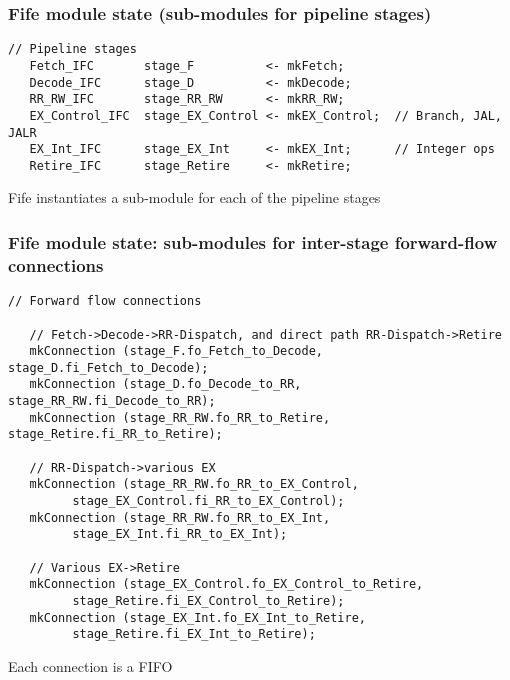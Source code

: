 \begin{frame}[fragile]
\frametitle{Fife module state (sub-modules for pipeline stages)}

\footnotesize

\begin{minipage}{0.75\textwidth}
\begin{Verbatim}[frame=single, label=From src\_Fife/CPU.bsv]
   // Pipeline stages
   Fetch_IFC       stage_F          <- mkFetch;
   Decode_IFC      stage_D          <- mkDecode;
   RR_RW_IFC       stage_RR_RW      <- mkRR_RW;
   EX_Control_IFC  stage_EX_Control <- mkEX_Control;  // Branch, JAL, JALR
   EX_Int_IFC      stage_EX_Int     <- mkEX_Int;      // Integer ops
   Retire_IFC      stage_Retire     <- mkRetire;
\end{Verbatim}
\end{minipage}
\hm
\begin{minipage}{0.22\textwidth}
Fife instantiates a sub-module for each of the pipeline stages
\end{minipage}



\end{frame}


\begin{frame}[fragile]
\frametitle{Fife module state: sub-modules for inter-stage forward-flow connections}

\footnotesize

\begin{minipage}{0.75\textwidth}\scriptsize
\begin{Verbatim}[frame=single, label=From src\_Fife/CPU.bsv]
   // Forward flow connections

   // Fetch->Decode->RR-Dispatch, and direct path RR-Dispatch->Retire
   mkConnection (stage_F.fo_Fetch_to_Decode,  stage_D.fi_Fetch_to_Decode);
   mkConnection (stage_D.fo_Decode_to_RR,     stage_RR_RW.fi_Decode_to_RR);
   mkConnection (stage_RR_RW.fo_RR_to_Retire, stage_Retire.fi_RR_to_Retire);

   // RR-Dispatch->various EX
   mkConnection (stage_RR_RW.fo_RR_to_EX_Control,
		 stage_EX_Control.fi_RR_to_EX_Control);
   mkConnection (stage_RR_RW.fo_RR_to_EX_Int,
		 stage_EX_Int.fi_RR_to_EX_Int);

   // Various EX->Retire
   mkConnection (stage_EX_Control.fo_EX_Control_to_Retire,
		 stage_Retire.fi_EX_Control_to_Retire);
   mkConnection (stage_EX_Int.fo_EX_Int_to_Retire,
		 stage_Retire.fi_EX_Int_to_Retire);
\end{Verbatim}
\end{minipage}
\hm
\begin{minipage}{0.22\textwidth}
Each connection is a FIFO
\end{minipage}

\end{frame}

